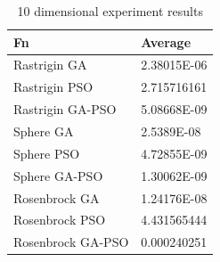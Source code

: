 \documentclass[runningheads]{llncs}
\begin{document}
      \begin{table}[htp]
        \caption{10 dimensional experiment results}
        \label{table:resultados-2}
        \centering
        \begin{tabular}{|l|l|}
        \hline
        Fn  & Average\\
        \hline
        \hline
        Rastrigin GA & 2.38015E-06\\
        \hline
        Rastrigin PSO & 2.715716161\\
        \hline
        Rastrigin GA-PSO & 5.08668E-09\\
        \hline
        Sphere GA & 2.5389E-08\\
        \hline
        Sphere PSO & 4.72855E-09\\
        \hline
        Sphere GA-PSO & 1.30062E-09\\
        \hline
        Rosenbrock GA & 1.24176E-08\\
        \hline
        Rosenbrock PSO & 4.431565444\\
        \hline
        Rosenbrock GA-PSO & 0.000240251\\
        \hline
        \end{tabular}
        \end{table}
          
      
      
\end{document}
